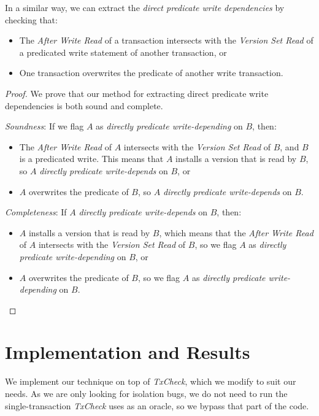 In a similar way, we can extract the \textit{direct predicate write dependencies} by checking that:
\begin{itemize}
    \item The \textit{After Write Read} of a transaction intersects with the \textit{Version Set Read} of a predicated write statement of another transaction, or
    \item One transaction overwrites the predicate of another write transaction.
\end{itemize}

\begin{proof}
    We prove that our method for extracting direct predicate write dependencies is both sound and complete.

    \textit{Soundness}: If we flag $A$ as \textit{directly predicate write-depending} on $B$, then:
    \begin{itemize}
        \item The \textit{After Write Read} of $A$ intersects with the \textit{Version Set Read} of $B$, and $B$ is a predicated write. This means that $A$ installs a version that is read by $B$, so $A$ \textit{directly predicate write-depends} on $B$, or
        \item $A$ overwrites the predicate of $B$, so $A$ \textit{directly predicate write-depends} on $B$.
    \end{itemize}

    \textit{Completeness}: If $A$ \textit{directly predicate write-depends} on $B$, then:
    \begin{itemize}
        \item $A$ installs a version that is read by $B$, which means that the \textit{After Write Read} of $A$ intersects with the \textit{Version Set Read} of $B$, so we flag $A$ as \textit{directly predicate write-depending} on $B$, or
        \item $A$ overwrites the predicate of $B$, so we flag $A$ as \textit{directly predicate write-depending} on $B$.
    \end{itemize}
\end{proof}

\section{Implementation and Results}

We implement our technique on top of \textit{TxCheck}, which we modify to suit our needs. As we are only looking for isolation bugs, we do not need to run the single-transaction \textit{TxCheck} uses as an oracle, so we bypass that part of the code.

